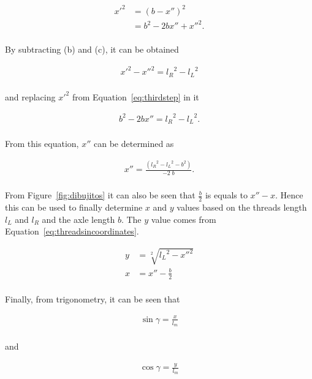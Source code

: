 \documentclass[journal]{IEEEtran}
\begin{document}
\begin{equation}
\begin{array}{ll}  
{x'}^2   	&=  ( b - x'')^2   \\
 						&= b^2 - 2 b x''+ {x''}^2. \\
\end{array}
\label{eq:thirdstep}
\end{equation}


By subtracting (b) and (c), it can be obtained

\begin{align*}
{x'}^2 - {x'' }^2 = {l_R}^2 - {l_L}^2 \\
\end{align*}

and replacing ${x'}^2$ from Equation~\ref{eq:thirdstep} in it

\begin{align*}
b^2 - 2 b {x''}= {l_R}^2 - {l_L}^2. \\
\end{align*}


From this equation, $x''$ can be determined as

\begin{align*}
x'' = \frac{({l_R}^2 - {l_L}^2 - b^2)}{-2 \; b}.    \\
\end{align*}

From Figure~\ref{fig:dibujitos} it can also be seen that $\frac{b}{2}$ is equals to $x'' - x$.  Hence this can be used to finally determine $x$ and $y$ values based on the threads length $l_L$ and $l_R$ and the axle length $b$.  The $y$ value comes from Equation~\ref{eq:threadsincoordinates}.

\begin{align*}
y &= \sqrt[2]{{l_L}^2 - {x''}^2 } \\
x &= x'' - \frac{b}{2}\\
\end{align*}

Finally, from trigonometry, it can be seen that

\begin{align*}
\sin{\gamma} = \frac{x}{l_m}\\
\end{align*}

and 

\begin{align*}
\cos{\gamma} = \frac{y}{l_m}\\
\end{align*}
\end{document}
